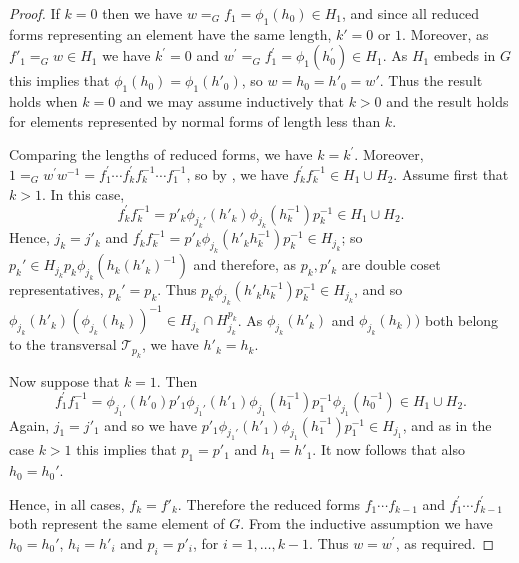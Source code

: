 \documentclass[a4paper,12pt]{article}
\numberwithin{equation}{section}
\numberwithin{figure}{section}
\newcommand{\cT}{\mathcal{T}}
\begin{document}
\begin{proof}
If $k=0$ then we have $w=_G f_1=\phi_1(h_0)\in H_{1}$, and since all 
reduced forms representing an element have the same length, $k'=0$ or $1$. 
Moreover, as $f'_1=_G w\in H_1$ we have 
 $k^\prime =0$ and $w^\prime=_G f_1^\prime=\phi_1(h_0^\prime)\in H_1$.
As $H_1$ embeds in $G$ this implies that $\phi_1(h_0)=\phi_1(h'_0)$, so
$w=h_0=h'_0=w'$. Thus the result
holds when $k=0$ and we may assume inductively that $k>0$ and the result holds
for elements represented by normal forms of length less than $k$.

Comparing the lengths of reduced forms, we have $k=k^\prime$.
Moreover, $1=_G w^\prime w^{-1}= f_1^\prime \cdots f_{k}^\prime
f_k^{-1}\cdots f_1^{-1}$, so by \cite[Chapter IV, Theorem 2.6]{LS}, 
we have $ f_{k}^\prime f_k^{-1}\in H_{1}\cup H_2$.
Assume first that $k>1$. 
In this case, 
\[ f_{k}^\prime f_k^{-1}= p'_k\phi_{j_k'}(h'_k)\phi_{j_k}(h_k^{-1})p_k^{-1}\in H_1\cup H_2.\] 
 Hence, $j_k=j'_k$ and 
$f_{k}^\prime f_k^{-1}=
p'_k\phi_{j_k}(h'_k h_k^{-1})p_k^{-1}\in H_{j_k}$; 
so $p_k'\in H_{j_k}p_k\phi_{j_k}(h_k (h'_k)^{-1})$ and therefore, as 
$p_k, p'_k$ are  double coset representatives,  
$p_k'=p_k$. 
Thus $p_k\phi_{j_k}(h'_k h_k^{-1})p_k^{-1}\in H_{j_k}$, 
and so $\phi_{j_k}(h'_k)(\phi_{j_k}(h_k))^{-1}\in H_{j_k}\cap H_{j_k}^{p_k}$.
As $\phi_{j_k}(h'_k)$ and $\phi_{j_k}(h_k))$ both belong to the 
transversal $\cT_{p_k}$, we have $h'_k=h_k$.

Now suppose that $k=1$. Then 
\[
f_{1}^\prime f_1^{-1}=\phi_{j_1'}(h'_0) p'_1\phi_{j_1'}(h'_1)
\phi_{j_1}(h_1^{-1})p_1^{-1}\phi_{j_1}(h_0^{-1})\in H_1\cup H_2.
\] 
Again, $j_1=j'_1$ and so we
 have $p'_1\phi_{j_1'}(h'_1)\phi_{j_1}(h_1^{-1})p_1^{-1}
\in H_{j_1}$, 
and as in the case $k>1$ this implies that $p_1=p'_1$ and 
$h_1=h'_1$. It now follows that also $h_0=h_0'$. 
 
Hence, in all cases, $f_k=f'_k$. 
Therefore the reduced forms 
$f_1\cdots f_{k-1}$ and 
$f_1^\prime \cdots f_{k-1}^\prime$ both represent the same 
element of $G$. From the inductive assumption we have 
$h_0=h_0'$,  $h_i=h'_i$ and $p_i=p'_i$, for $i=1,\ldots, k-1$. 
Thus 
   $w=w^\prime$, as required.
\end{proof}
\end{document}
